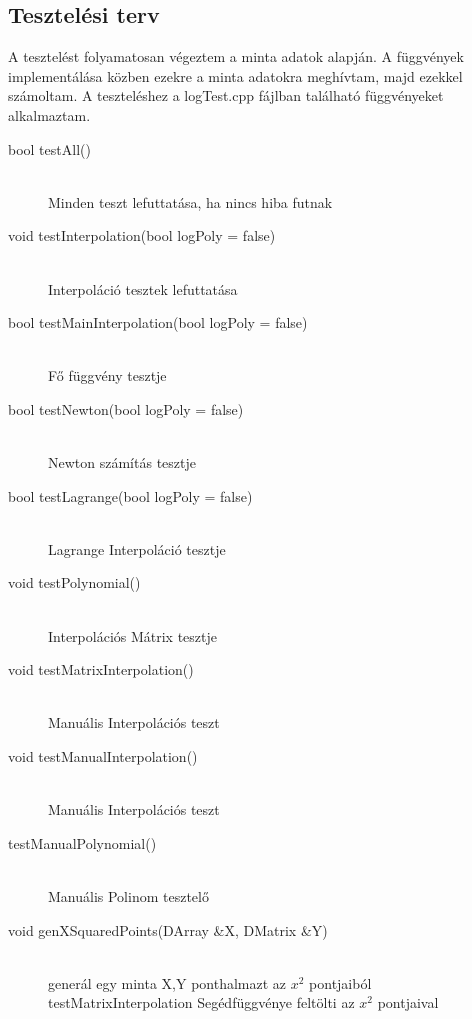 \subsection{Tesztelési terv}
	A tesztelést folyamatosan végeztem a minta adatok alapján. A függvények implementálása közben ezekre a minta adatokra meghívtam, majd ezekkel számoltam. A teszteléshez a logTest.cpp fájlban található függvényeket alkalmaztam. 
	\begin{description}
		\item[bool testAll()] \hfill \\ 
			Minden teszt lefuttatása, ha nincs hiba futnak
		\item[void testInterpolation(bool logPoly = false)] \hfill \\ 
			Interpoláció tesztek lefuttatása
		\item[bool testMainInterpolation(bool logPoly = false)] \hfill \\ 
			Fő függvény tesztje
		\item[bool testNewton(bool logPoly = false)] \hfill \\ 
			Newton számítás tesztje
		\item[bool testLagrange(bool logPoly = false)] \hfill \\ 
			Lagrange Interpoláció tesztje
		\item[void testPolynomial()] \hfill \\ 
			Interpolációs Mátrix tesztje
		\item[void testMatrixInterpolation()] \hfill \\ 
			Manuális Interpolációs teszt
		\item[void testManualInterpolation()] \hfill \\ 
			Manuális Interpolációs teszt

		\item[testManualPolynomial()] \hfill \\ 
			Manuális Polinom tesztelő 
		\item[void genXSquaredPoints(DArray \&X, DMatrix \&Y)] \hfill \\ 
			generál egy minta X,Y ponthalmazt az $x^{2}$ 
			pontjaiból
		testMatrixInterpolation Segédfüggvénye
		feltölti az $x^{2}$ pontjaival 
	\end{description}
